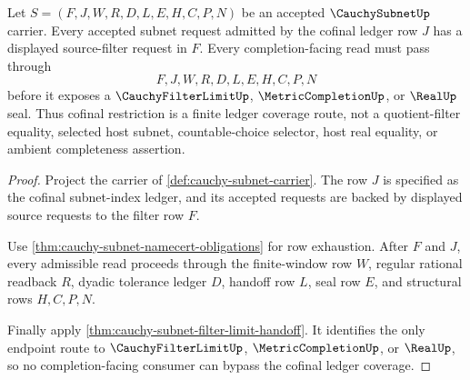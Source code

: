 \begin{theorem}
\label{thm:cauchy-subnet-cofinal-ledger-coverage}
Let $S=(F,J,W,R,D,L,E,H,C,P,N)$ be an accepted $\CauchySubnetUp$ carrier. Every accepted subnet request admitted by the cofinal ledger row $J$ has a displayed source-filter request in $F$. Every completion-facing read must pass through
$$
F,J,W,R,D,L,E,H,C,P,N
$$
before it exposes a $\CauchyFilterLimitUp$, $\MetricCompletionUp$, or $\RealUp$ seal. Thus cofinal restriction is a finite ledger coverage route, not a quotient-filter equality, selected host subnet, countable-choice selector, host real equality, or ambient completeness assertion.
\end{theorem}
\begin{proof}
Project the carrier of \autoref{def:cauchy-subnet-carrier}. The row $J$ is specified as the cofinal subnet-index ledger, and its accepted requests are backed by displayed source requests to the filter row $F$.

Use \autoref{thm:cauchy-subnet-namecert-obligations} for row exhaustion. After $F$ and $J$, every admissible read proceeds through the finite-window row $W$, regular rational readback $R$, dyadic tolerance ledger $D$, handoff row $L$, seal row $E$, and structural rows $H,C,P,N$.

Finally apply \autoref{thm:cauchy-subnet-filter-limit-handoff}. It identifies the only endpoint route to $\CauchyFilterLimitUp$, $\MetricCompletionUp$, or $\RealUp$, so no completion-facing consumer can bypass the cofinal ledger coverage.
\end{proof}


